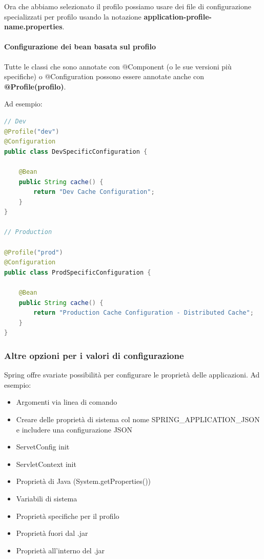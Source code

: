 \documentclass[11pt,a4paper]{book}
\begin{document}
Ora che abbiamo selezionato il profilo possiamo usare dei file di configurazione specializzati per profilo usando la notazione \textbf{application-{profile-name}.properties}.

\paragraph{Configurazione dei bean basata sul profilo}
Tutte le classi che sono annotate con @Component (o le sue versioni più specifiche) o @Configuration possono essere annotate anche con \textbf{@Profile(profilo)}.

Ad esempio:
\begin{lstlisting}[language = Java]
// Dev
@Profile("dev")
@Configuration
public class DevSpecificConfiguration {
	
	@Bean
	public String cache() {
		return "Dev Cache Configuration";
	}
}

// Production

@Profile("prod")
@Configuration
public class ProdSpecificConfiguration {
	
	@Bean
	public String cache() {
		return "Production Cache Configuration - Distributed Cache";
	}
}
\end{lstlisting}


\subsubsection{Altre opzioni per i valori di configurazione}
Spring offre svariate possibilità per configurare le proprietà delle applicazioni. Ad esempio:
\begin{itemize}
	\item Argomenti via linea di comando
	\item Creare delle proprietà di sistema col nome SPRING\_APPLICATION\_JSON e includere una configurazione JSON
	\item ServetConfig init
	\item ServletContext init
	\item Proprietà di Java (System.getProperties())
	\item Variabili di sistema
	\item Proprietà specifiche per il profilo
	\item Proprietà fuori dal .jar
	\item Proprietà all'interno del .jar
\end{itemize}
\end{document}
